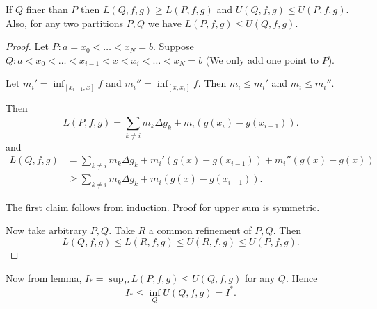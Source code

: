 \begin{lemma}
	If $Q$ finer than $P$ then $L(Q, f, g) \ge L(P, f, g)$ and $U(Q, f, g) \le U(P, f, g)$. Also, for any two partitions $P, Q $ we have $L(P, f, g) \le U(Q, f, g)$.
\end{lemma}
\begin{proof}
	Let $P: a = x_0 < \ldots < x_N = b$. Suppose $Q: a < x_0 < \ldots < x_{i-1} < \overline{x} <x_i < \ldots < x_N = b$ (We only add one point to $P$).

	Let $m_i' = \operatorname{inf}_{[x_{i-1}, \overline{x} ]}f$ and $m_i'' = \operatorname{inf} _{[\overline{x} , x_{i}]}f$. Then $m_i \le m_i'$ and $m_i \le m_{i}''$.

	Then  \[
		L(P, f, g) = \sum_{k \neq  i}^{} m_k \Delta g_k + m_i \left( g(x_i) - g(x_{i-1}) \right) 
	.\] 
	and
\begin{align*}
	L(Q, f, g) &= \sum_{k \neq  i}^{} m_k \Delta g_k + m_i' \left( g(\overline{x} ) - g(x_{i-1}) \right) +  m_i'' \left( g(\overline{x} ) - g(\overline{x} ) \right) \\
		   &\ge \sum_{k \neq  i}^{} m_k \Delta g_k + m_i \left( g(\overline{x} ) - g(x_{i-1}) \right)
	.\end{align*}

	The first claim follows from induction. Proof for upper sum is symmetric. 

	Now take arbitrary $P, Q$. Take $R$ a common refinement of $P, Q$. Then
	\[
		L(Q, f, g) \le L(R, f, g) \le U(R, f, g) \le U(P, f, g)
	.\] 
\end{proof}

Now from lemma,
$I_* = \operatorname{sup}_P L(P, f, g) \le U(Q, f, g)$ for any $Q$. Hence
\[
	I_* \le \operatorname{inf}_Q U(Q, f, g) = I^*
.\] 

